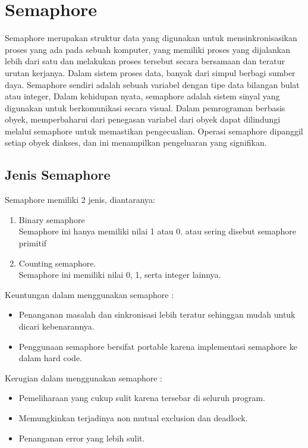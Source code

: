 \section{Semaphore}
Semaphore merupakan struktur data yang digunakan untuk mensinkronisasikan proses yang ada pada sebuah komputer, yang memiliki proses yang dijalankan lebih dari satu dan melakukan proses tersebut secara bersamaan dan teratur urutan kerjanya. Dalam sistem proses data, banyak dari simpul berbagi sumber daya. 
Semaphore sendiri adalah sebuah variabel dengan tipe data bilangan bulat atau integer, Dalam kehidupan nyata, semaphore adalah sistem sinyal yang digunakan untuk berkomunikasi secara visual. 
\cite{zuberi1997efficient}Dalam pemrograman berbasis obyek, memperbaharui dari penegasan variabel dari obyek dapat dilindungi melalui semaphore untuk memastikan pengecualian. Operasi semaphore dipanggil setiap obyek diakses, dan ini menampilkan pengeluaran yang signifikan.


\subsection{Jenis Semaphore}
Semaphore memiliki 2 jenis, diantaranya:
\begin{enumerate}
	\item Binary semaphore \\ Semaphore ini hanya memiliki nilai 1 atau 0. atau sering disebut semaphore primitif
	\item Counting semaphore.\\ Semaphore ini memiliki nilai 0, 1, serta integer lainnya.
\end{enumerate}

Keuntungan dalam menggunakan semaphore :

\begin{itemize}
	\item Penanganan masalah dan sinkronisasi lebih teratur sehinggan mudah untuk dicari kebenarannya.
	\item Penggunaan semaphore bersifat portable karena implementasi semaphore ke dalam hard code.
\end{itemize}
	
	Kerugian dalam menggunakan semaphore :
	
	\begin{itemize}
		\item Pemeliharaan yang cukup sulit karena tersebar di seluruh program.
		\item Memungkinkan terjadinya non  mutual exclusion dan deadlock.
		\item Penanganan error yang lebih sulit.
	\end{itemize}
